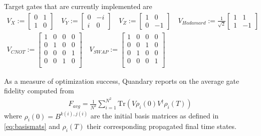 \documentclass[11pt]{article}
\begin{document}
Target gates that are currently implemented are
\begin{align}
  V_{X} := \begin{bmatrix} 0 & 1 \\ 1 & 0  \end{bmatrix} \quad
  V_{Y} := \begin{bmatrix} 0 & -i \\ i & 0 \end{bmatrix} \quad
  V_{Z} := \begin{bmatrix} 1 & 0 \\ 0 & -1 \end{bmatrix} \quad 
  V_{Hadamard} := \frac{1}{\sqrt{2}} 
           \begin{bmatrix} 1 & 1 \\ 1 & -1 \end{bmatrix} \\
  V_{CNOT} := \begin{bmatrix} 1  & 0 & 0 & 0 \\ 
                               0  & 1 & 0 & 0 \\ 
                               0  & 0 & 0 & 1 \\ 
                               0  & 0 & 1 & 0 \\ 
                \end{bmatrix} \quad 
  V_{SWAP} := \begin{bmatrix}
    1 & 0 & 0 & 0 \\
    0 & 0 & 1 & 0 \\
    0 & 1 & 0 & 0 \\
    0 & 0 & 0 & 1 \\
  \end{bmatrix}
\end{align}

As a measure of optimization success, Quandary reports on the average gate fidelity computed from 
\begin{align}
  F_{avg} = \frac{1}{N^2} \sum_{i=1}^{N^2} \mbox{Tr}\left(V\rho_i(0)V^{\dagger}\rho_i(T) \right) 
\end{align}
where $\rho_i(0) = B^{k(i), j(i)}$ are the initial basis matrices as defined in \eqref{eq:basismats} and $\rho_i(T)$ their corresponding propagated final time states.
\end{document}
